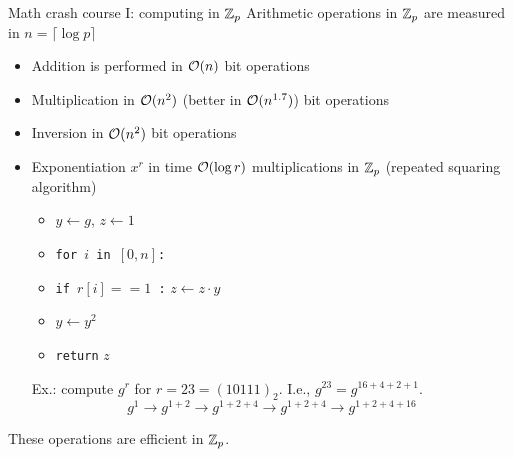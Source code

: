\documentclass[usenames,dvipsnames, 9pt]{beamer}
\begin{document}
\begin{frame}{Math crash course I: computing in ${{\mathbb Z}}_p$ }
	\large
	Arithmetic operations in ${{\mathbb Z}}_p$ are measured in $n = \lceil \log p \rceil$
	\begin{itemize}
		\itemsep 10pt
		\item Addition is performed in $\mathcal{O}(n)$ bit operations
		\item Multiplication in $\mathcal{O}(n^2)$ (better in $\mathcal{O}(n^{1.7})$) bit operations
		\item Inversion in  $\mathcal{O}(n^2)$ bit operations
		\pause
		\item Exponentiation $x^r$ in time  $\mathcal{O}(\log r)$ multiplications in ${{\mathbb Z}}_p$ (repeated squaring algorithm)\\
		\begin{itemize}
			\item $y \leftarrow g$, $z \leftarrow 1$
			\item \texttt{for $i$ in $[0, n]$:}
			\item \hspace{10pt}  \texttt{if $r[i]==1$ :} $z \leftarrow z \cdot y$
			\item \hspace{10pt}  $y \leftarrow y^2$
			\item \texttt{return} $z$
		\end{itemize}
		\pause 
		Ex.: compute $g^r$ for $r = 23 = (10111)_2$. I.e., $g^{23} = g^{16+4+2+1}$. \\
		\[
			g^1 \rightarrow g^{1+2} \rightarrow g^{1+2+4} \rightarrow  g^{1+2+4} \rightarrow g^{1+2+4+16} 
		\]
	
	\end{itemize}

\vspace{15pt}
\centering
\Large
These operations are {\color{Orange} {efficient}} in ${{\mathbb Z}}_p$.
\end{frame}
\end{document}
